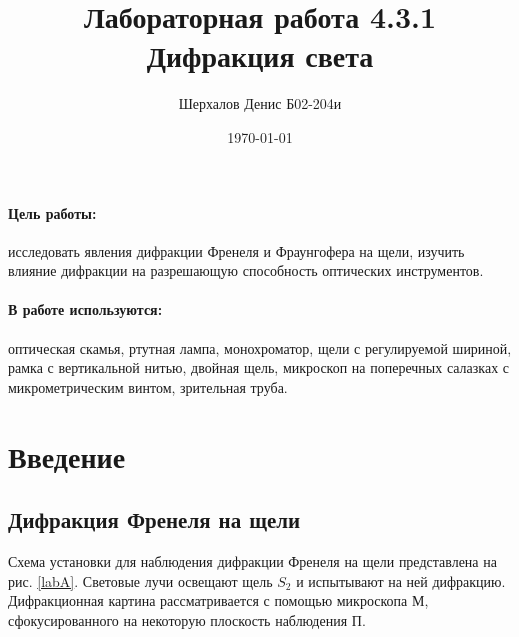 \documentclass[a4paper,12pt]{article}
\author{Шерхалов Денис Б02-204и}
\title{Лабораторная работа 4.3.1 \\
	\textbf{Дифракция света}}
\date{\today}
\theoremstyle{definition}
\begin{document}
	
{\Large \maketitle}

	\paragraph*{Цель работы:} исследовать явления дифракции Френеля и Фраунгофера на щели, изучить влияние дифракции на разрешающую способность оптических инструментов.

	\paragraph*{В работе используются:} оптическая скамья, ртутная лампа, монохроматор, щели с регулируемой шириной, рамка с вертикальной нитью, двойная щель, микроскоп на поперечных салазках с микрометрическим винтом, зрительная труба.

\section{Введение}
\subsection{Дифракция Френеля на щели}

Схема установки для наблюдения дифракции Френеля на щели представлена на рис. \ref{labA}. Световые лучи освещают щель $ S_2 $ и испытывают на ней дифракцию. Дифракционная картина рассматривается с помощью микроскопа М, сфокусированного на некоторую плоскость наблюдения П.
\end{document}
